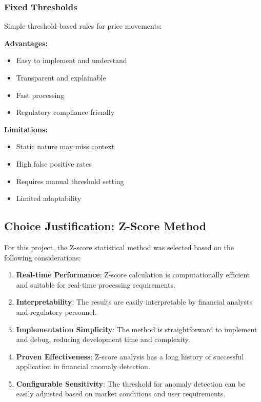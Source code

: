 \subsubsection{Fixed Thresholds}

Simple threshold-based rules for price movements:

\textbf{Advantages:}
\begin{itemize}
    \item Easy to implement and understand
    \item Transparent and explainable
    \item Fast processing
    \item Regulatory compliance friendly
\end{itemize}

\textbf{Limitations:}
\begin{itemize}
    \item Static nature may miss context
    \item High false positive rates
    \item Requires manual threshold setting
    \item Limited adaptability
\end{itemize}

\subsection{Choice Justification: Z-Score Method}

For this project, the Z-score statistical method was selected based on the following considerations:

\begin{enumerate}
    \item \textbf{Real-time Performance}: Z-score calculation is computationally efficient and suitable for real-time processing requirements.
    
    \item \textbf{Interpretability}: The results are easily interpretable by financial analysts and regulatory personnel.
    
    \item \textbf{Implementation Simplicity}: The method is straightforward to implement and debug, reducing development time and complexity.
    
    \item \textbf{Proven Effectiveness}: Z-score analysis has a long history of successful application in financial anomaly detection.
    
    \item \textbf{Configurable Sensitivity}: The threshold for anomaly detection can be easily adjusted based on market conditions and user requirements.
\end{enumerate}

